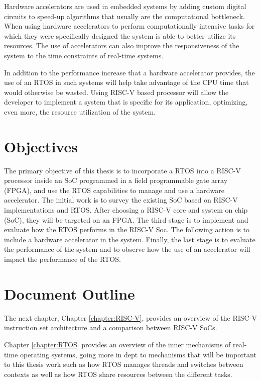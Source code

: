 Hardware accelerators are used in embedded systems by adding custom digital circuits to speed-up algorithms that usually are the computational bottleneck. When using hardware accelerators to perform computationally intensive tasks for which they were specifically designed the system is able to better utilize its resources. The use of accelerators can also improve the responsiveness of the system to the time constraints of real-time systems.

In addition to the performance increase that a hardware accelerator provides, the use of an RTOS in such systems will help take advantage of the CPU time that would otherwise be wasted. Using RISC-V based processor will allow the developer to implement a system that is specific for its application, optimizing, even more, the resource utilization of the system.


\section{Objectives}
\label{section:objectives}
The primary objective of this thesis is to incorporate a RTOS into a RISC-V processor inside an SoC programmed in a field programmable gate array (FPGA), and use the RTOS capabilities to manage and use a hardware accelerator. The initial work is to survey the existing SoC based on RISC-V implementations and RTOS. After choosing a RISC-V core and system on chip (SoC), they will be targeted on an FPGA. The third stage is to implement and evaluate how the RTOS performs in the RISC-V Soc. The following action is to include a hardware accelerator in the system. Finally, the last stage is to evaluate the performance of the system and to observe how the use of an accelerator will impact the performance of the RTOS.


\section{Document Outline}
The next chapter, Chapter \ref{chapter:RISC-V}, provides an overview of the RISC-V instruction set architecture and a comparison between RISC-V SoCs. 

Chapter \ref{chapter:RTOS} provides an overview of the inner mechanisms of real-time operating systems, going more in dept to mechanisms that will be important to this thesis work such as how RTOS manages threads and switches between contexts as well as how RTOS share resources between the different tasks.

